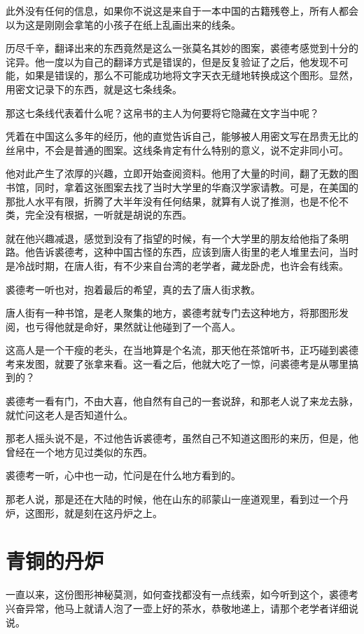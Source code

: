 此外没有任何的信息，如果你不说这是来自于一本中国的古籍残卷上，所有人都会以为这是刚刚会拿笔的小孩子在纸上乱画出来的线条。

历尽千辛，翻译出来的东西竟然是这么一张莫名其妙的图案，裘德考感觉到十分的诧异。他一度以为自己的翻译方式是错误的，但是反复验证了之后，他发现不可能，如果是错误的，那么不可能成功地将文字天衣无缝地转换成这个图形。显然，用密文记录下的东西，就是这七条线条。

那这七条线代表着什么呢？这帛书的主人为何要将它隐藏在文字当中呢？

凭着在中国这么多年的经历，他的直觉告诉自己，能够被人用密文写在昂贵无比的丝帛中，不会是普通的图案。这线条肯定有什么特别的意义，说不定非同小可。

他对此产生了浓厚的兴趣，立即开始查阅资料。他用了大量的时间，翻了无数的图书馆，同时，拿着这张图案去找了当时大学里的华裔汉学家请教。可是，在美国的那批人水平有限，折腾了大半年没有任何结果，就算有人说了推测，也是不伦不类，完全没有根据，一听就是胡说的东西。

就在他兴趣减退，感觉到没有了指望的时候，有一个大学里的朋友给他指了条明路。他告诉裘德考，这种中国古怪的东西，应该到唐人街里的老人堆里去问，当时是冷战时期，在唐人街，有不少来自台湾的老学者，藏龙卧虎，也许会有线索。

裘德考一听也对，抱着最后的希望，真的去了唐人街求教。

唐人街有一种书馆，是老人聚集的地方，裘德考就专门去这种地方，将那图形发阅，也亏得他就是命好，果然就让他碰到了一个高人。

这高人是一个干瘦的老头，在当地算是个名流，那天他在茶馆听书，正巧碰到裘德考来发图，就要了张拿来看。这一看之后，他就大吃了一惊，问裘德考是从哪里搞到的？

裘德考一看有门，不由大喜，他自然有自己的一套说辞，和那老人说了来龙去脉，就忙问这老人是否知道什么。

那老人摇头说不是，不过他告诉裘德考，虽然自己不知道这图形的来历，但是，他曾经在一个地方见过类似的东西。

裘德考一听，心中也一动，忙问是在什么地方看到的。

那老人说，那是还在大陆的时候，他在山东的祁蒙山一座道观里，看到过一个丹炉，这图形，就是刻在这丹炉之上。

\chapter{青铜的丹炉}

一直以来，这份图形神秘莫测，如何查找都没有一点线索，如今听到这个，裘德考兴奋异常，他马上就请人泡了一壶上好的茶水，恭敬地递上，请那个老学者详细说说。

